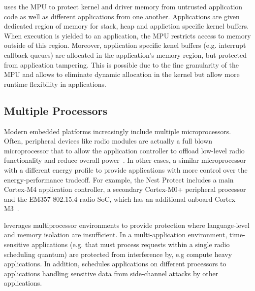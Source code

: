 \name uses the MPU to protect kernel and driver memory from untrusted
application code as well as different applications from one another.
Applications are given dedicated region of memory for stack, heap and appliction
specific kernel buffers. When execution is yielded to an application, the MPU
restricts access to memory outside of this region. Moreover, application
specific kenel buffers (e.g. interrupt callback queues) are allocated in the
application's memory region, but protected from application tampering. This is
possible due to the fine granularity of the MPU and allows \name to eliminate
dynamic allocation in the kernel but allow more runtime flexibility in
applications.

\subsection{Multiple Processors}

Modern embedded platforms increasingly include multiple microprocessors. Often,
peripheral devices like radio modules are actually a full blown microprocessor
that to allow the application controller to offload low-level radio
functionality and reduce overall power~\cite{nrf51822,cc2540}. In other cases, a
similar microprocessor with a different energy profile to provide applications
with more control over the energy-performance tradeoff.  For example, the Nest
Protect includes a main Cortex-M4 application controller, a secondary Cortex-M0+
peripheral processor and the EM357 802.15.4 radio SoC, which has an additional
onboard Cortex-M3~\cite{nestprotect-teardown}.

\name leverages multiprocessor environments to provide protection where
language-level and memory isolation are insufficient. In a multi-application
environment, time-sensitive applications (e.g. that must process requests
within a single radio scheduling quantum) are protected from interference by,
e.g compute heavy applications. In addition, \name schedules applications on
different processors to applications handling sensitive data from side-channel
attacks by other applications.

